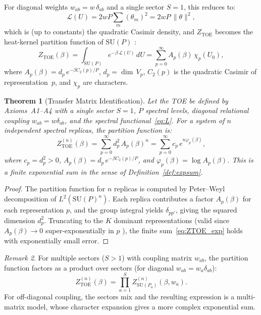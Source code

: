 \documentclass[12pt]{article}
\newtheorem{theorem}{Theorem}[section]
\theoremstyle{definition}
\theoremstyle{remark}
\newtheorem{remark}[theorem]{Remark}
\newcommand{\SU}{\mathrm{SU}}
\newcommand{\TOE}{\mathrm{TOE}}
\begin{document}
For diagonal weights $w_{ab} = w\,\delta_{ab}$ and a single sector
$S=1$, this reduces to:
\[
\mathcal{L}(U) = 2wP \sum_m (\theta_m)^2 = 2wP\,\|\theta\|^2,
\]
which is (up to constants) the quadratic Casimir density, and
$Z_\TOE$ becomes the heat-kernel partition function of $\SU(P)$
\cite{Menotti1981}:
\begin{equation}\label{eq:ZHK}
Z_\TOE(\beta)
= \int_{\SU(P)} e^{-\beta\,\mathcal{L}(U)}\,dU
= \sum_{p=0}^\infty A_p(\beta)\,\chi_p(U_0),
\end{equation}
where $A_p(\beta) = d_p\,e^{-\beta C_2(p)/P}$, $d_p = \dim\,V_p$,
$C_2(p)$ is the quadratic Casimir of representation~$p$,
and $\chi_p$ are characters.

\begin{theorem}[Transfer Matrix Identification]\label{thm:identification}
Let the TOE be defined by Axioms~A1--A4 with a single sector
$S=1$, $P$ spectral levels, diagonal relational coupling $w_{ab}=w\delta_{ab}$,
and the spectral functional~\eqref{eq:L}.
For a system of $n$ independent spectral replicas, the partition function is:
\begin{equation}\label{eq:ZTOE_exp}
Z_\TOE^{(n)}(\beta)
= \sum_{p=0}^\infty d_p^2\,A_p(\beta)^n
= \sum_{p=0}^\infty c_p\,e^{n\varphi_p(\beta)},
\end{equation}
where $c_p = d_p^2 > 0$, $A_p(\beta) = d_p\,e^{-\beta C_2(p)/P}$,
and $\varphi_p(\beta) = \log A_p(\beta)$.
This is a finite exponential sum in the sense of Definition~\ref{def:expsum}.
\end{theorem}

\begin{proof}
The partition function for $n$ replicas is computed by Peter--Weyl
decomposition of $L^2(\SU(P)^n)$.  Each replica contributes a factor
$A_p(\beta)$ for each representation $p$, and the group integral yields
$\delta_{pp'}$, giving the squared dimension $d_p^2$.
Truncating to the $K$ dominant representations (valid since
$A_p(\beta) \to 0$ super-exponentially in $p$ \cite{OlbrykPsi2026}),
the finite sum~\eqref{eq:ZTOE_exp} holds with exponentially small error.
\end{proof}

\begin{remark}
For multiple sectors ($S > 1$) with coupling matrix $w_{ab}$,
the partition function factors as a product over sectors
(for diagonal $w_{ab} = w_a\delta_{ab}$):
\[
Z_\TOE^{(n)}(\beta)
= \prod_{a=1}^S Z_{\SU(P_a)}^{(n)}(\beta,w_a).
\]
For off-diagonal coupling, the sectors mix and the resulting
expression is a multi-matrix model, whose character expansion
gives a more complex exponential sum.
\end{remark}
\end{document}
